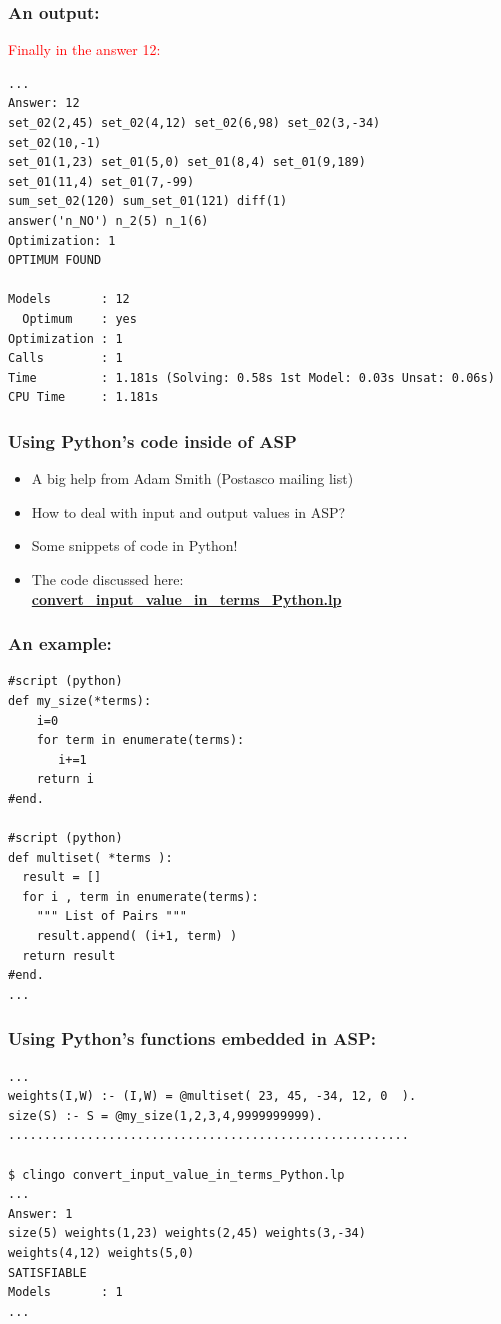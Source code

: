 \documentclass{beamer}
\begin{document}
\begin{frame} [fragile]
\frametitle{An output:}
\textcolor{red}{Finally in the answer 12:}
{\small
\begin{verbatim}
...
Answer: 12    
set_02(2,45) set_02(4,12) set_02(6,98) set_02(3,-34) 
set_02(10,-1) 
set_01(1,23) set_01(5,0) set_01(8,4) set_01(9,189) 
set_01(11,4) set_01(7,-99) 
sum_set_02(120) sum_set_01(121) diff(1) 
answer('n_NO') n_2(5) n_1(6)
Optimization: 1
OPTIMUM FOUND

Models       : 12
  Optimum    : yes
Optimization : 1
Calls        : 1
Time         : 1.181s (Solving: 0.58s 1st Model: 0.03s Unsat: 0.06s)
CPU Time     : 1.181s

\end{verbatim}
}	
\end{frame}

\begin{frame} [fragile]
\frametitle{Using Python's code inside of ASP}

\begin{itemize}
\item A big help from Adam Smith (Postasco mailing list)
\item How to deal with input and output values in ASP?
\pause
\item Some snippets of code in Python!
\item The code discussed here:\\
\textbf{\textcolor{blue}{\url{convert_input_value_in_terms_Python.lp}}}

\end{itemize}
	
\end{frame}

\begin{frame} [fragile]
\frametitle{An example:}
	
{\small
\begin{verbatim}
#script (python)
def my_size(*terms):
    i=0
    for term in enumerate(terms):
       i+=1
    return i
#end.

#script (python)
def multiset( *terms ):
  result = []
  for i , term in enumerate(terms):
    """ List of Pairs """
    result.append( (i+1, term) )
  return result
#end.
...
\end{verbatim}
}	
\end{frame}




\begin{frame} [fragile]
\frametitle{Using Python's functions embedded in ASP:}
	
{\small
\begin{verbatim}
...
weights(I,W) :- (I,W) = @multiset( 23, 45, -34, 12, 0  ).
size(S) :- S = @my_size(1,2,3,4,9999999999).
........................................................

$ clingo convert_input_value_in_terms_Python.lp
...
Answer: 1
size(5) weights(1,23) weights(2,45) weights(3,-34) 
weights(4,12) weights(5,0)
SATISFIABLE
Models       : 1
...
\end{verbatim}
}	
\end{frame}
\end{document}
